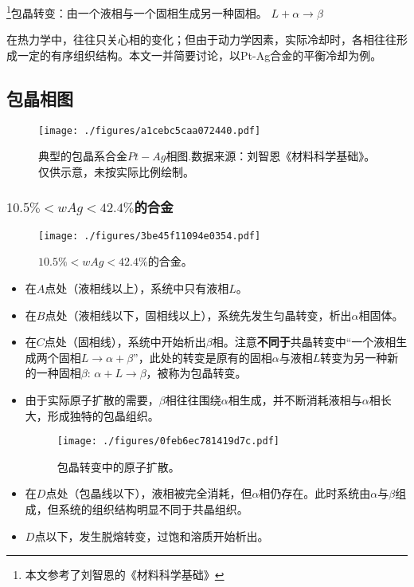 

\footnote{本文参考了刘智恩的《材料科学基础》}包晶转变：由一个液相与一个固相生成另一种固相。 $L + \alpha \rightarrow \beta$

在热力学中，往往只关心相的变化；但由于动力学因素，实际冷却时，各相往往形成一定的有序组织结构。本文一并简要讨论，以Pt-Ag合金的平衡冷却为例。

\subsection{包晶相图}

\begin{figure}[ht]
\centering
\texttt{[image: ./figures/a1cebc5caa072440.pdf]}
\caption{典型的包晶系合金$Pt-Ag$相图.数据来源：刘智恩《材料科学基础》。仅供示意，未按实际比例绘制。} \label{fig_PERITC_4}
\end{figure}

\subsubsection{$10.5\%<wAg<42.4\%$的合金} 
\begin{figure}[ht]
\centering
\texttt{[image: ./figures/3be45f11094e0354.pdf]}
\caption{$10.5\%<wAg<42.4\%$的合金。} \label{fig_PERITC_2}
\end{figure}

\begin{itemize}
\item 在$A$点处（液相线以上），系统中只有液相$L$。
\item 在$B$点处（液相线以下，固相线以上），系统先发生匀晶转变，析出$\alpha$相固体。
\item 在$C$点处（固相线），系统中开始析出$\beta$相。注意\textbf{不同于}共晶转变中“一个液相生成两个固相$L\to\alpha+\beta$”，此处的转变是原有的固相$\alpha$与液相$L$转变为另一种新的一种固相$\beta$: $\alpha+L\to\beta$，被称为包晶转变。
\item 由于实际原子扩散的需要，$\beta$相往往围绕$\alpha$相生成，并不断消耗液相与$\alpha$相长大，形成独特的包晶组织。
\begin{figure}[ht]
\centering
\texttt{[image: ./figures/0feb6ec781419d7c.pdf]}
\caption{包晶转变中的原子扩散。} \label{fig_PERITC_6}
\end{figure}
\item 在$D$点处（包晶线以下），液相被完全消耗，但$\alpha$相仍存在。此时系统由$\alpha$与$\beta$组成，但系统的组织结构明显不同于共晶组织。
\item $D$点以下，发生脱熔转变，过饱和溶质开始析出。
\end{itemize}

